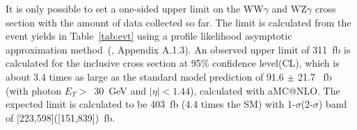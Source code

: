 \begin{table}[htb]
\centering
  \caption{Expected number of events per process. The predicted number of events for the W$\gamma$+jets and WV+jet processes, where the jet is reconstructed as 
a photon, are derived from data. The "Total prediction" represents the sum of all the individual contributions.}
  \label{tab:evt}
\end{table}

It is only possible to set a one-sided upper limit on the WW$\gamma$ and WZ$\gamma$ cross section with the amount of data
collected so far. The limit is calculated from the
event yields in Table~\ref{tab:evt} using a profile likelihood
asymptotic approximation method~(\cite{CMS-NOTE-2011-005},
Appendix A.1.3). An observed upper limit of 311~fb is calculated for the inclusive
cross section at 95\% confidence level(CL), which is about 3.4 times as large as
 the standard model prediction of 91.6 $\pm$ 21.7 ~fb (with photon $E_{T} >$~30~GeV and $|\eta|<1.44$), calculated with {\sc aMC@NLO}. The 
expected limit is calculated to be 403~fb (4.4 times the SM) 
with 1-$\sigma$(2-$\sigma$) band of [223,598]([151,839])~fb.

